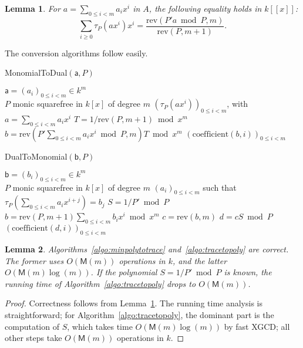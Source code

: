 \documentclass{sig-alternate}
\def\M {\ensuremath{\mathsf{M}}}
\def\va {\ensuremath{\mathsf{a}}}
\def\vb {\ensuremath{\mathsf{b}}}
\def\coeff {\ensuremath{\mathrm{coefficient}}}
\def\rev {\ensuremath{\mathrm{rev}}}
\newtheorem{Lemma}{Lemma}
\begin{document}
\begin{Lemma}\label{lemma:trace:1}
  For $a=\sum_{0 \le i < m} a_i x^i$ in $A$, the following equality
  holds in $k[[x]]$:
  $$\sum_{i \ge 0} \tau_P(a x^i) x^i = \frac{\rev( P' a \bmod P,m)}{\rev(P,m+1)}.$$
\end{Lemma}

The conversion algorithms follow easily. 

\begin{algorithm}[H]
  \caption{MonomialToDual$(\va, P)$}
  \begin{algorithmic}[1]
    \REQUIRE $\va=(a_i)_{0 \le i < m} \in k^m$ \\
    $P$ monic squarefree in $k[x]$ of degree $m$
    \ENSURE $(\tau_P(a x^i))_{0 \le i < m}$, with $a=\sum_{0 \le i < m} a_i x^i$
    \STATE $T = 1/\rev(P, m+1) \bmod x^m$
    \STATE\label{algo:minpolytotrace:1} $b = \rev(P' \sum_{0 \le i < m} a_i x^i \bmod P, m) T \bmod x^m$
    \RETURN $(\coeff(b,i))_{0 \le i < m}$
  \end{algorithmic}
  \label{algo:minpolytotrace}
\end{algorithm}

\begin{algorithm}[H]
  \caption{DualToMonomial$(\vb, P)$}
  \begin{algorithmic}[1]
    \REQUIRE $\vb=(b_i)_{0 \le i < m} \in k^m$\\
    $P$ monic squarefree in $k[x]$ of degree $m$
    \ENSURE $(a_i)_{0 \le i < m}$ such that $\tau_P(\sum_{0 \le i < m} a_i x^{i+j}) = b_j$
    \STATE $S = 1/P' \bmod P$
    \STATE $b= \rev(P,m+1) \sum_{0 \le i < m} b_i x^i \bmod x^m$
    \STATE $c= \rev(b, m)$
    \STATE\label{algo:minpolytotrace:1} $d =c S \bmod P$
    \RETURN $(\coeff(d,i))_{0 \le i < m}$
  \end{algorithmic}
  \label{algo:tracetopoly}
\end{algorithm}

\begin{Lemma}\label{lemma:uniconv}
  Algorithms~\ref{algo:minpolytotrace} and~\ref{algo:tracetopoly} are
  correct. The former uses $O(\M(m))$ operations in $k$, and the
  latter $O(\M(m)\log(m))$.  If the polynomial $S=1/P' \bmod P$ is
  known, the running time of Algorithm~\ref{algo:tracetopoly} drops to
  $O(\M(m))$.
\end{Lemma}
\begin{proof}
  Correctness follows from Lemma~\ref{lemma:trace:1}.  The running
  time analysis is straightforward; for
  Algorithm~\ref{algo:tracetopoly}, the dominant part is the
  computation of $S$, which takes time $O(\M(m)\log(m))$ by fast XGCD;
  all other steps take $O(\M(m))$ operations in $k$.
\end{proof}
\end{document}
